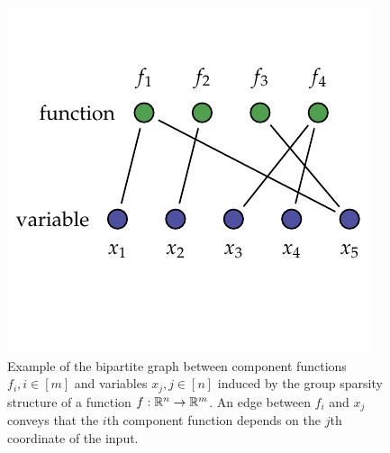 \begin{figure}[t]
\centering
\includegraphics{figures/lecture12-function_coordinate_graph.pdf}

%
%
%
%
\vspace{-20pt}
\caption{
  Example of the bipartite graph between component functions
  $f_i, i \in [m]$ and variables $x_j, j \in [n]$ induced by the
  group sparsity structure of a function $f : \mathbb{R}^n \to \mathbb{R}^m$.
  An edge between $f_i$ and $x_j$ conveys that the $i$th component function
  depends on the $j$th coordinate of the input.
}
\end{figure}


